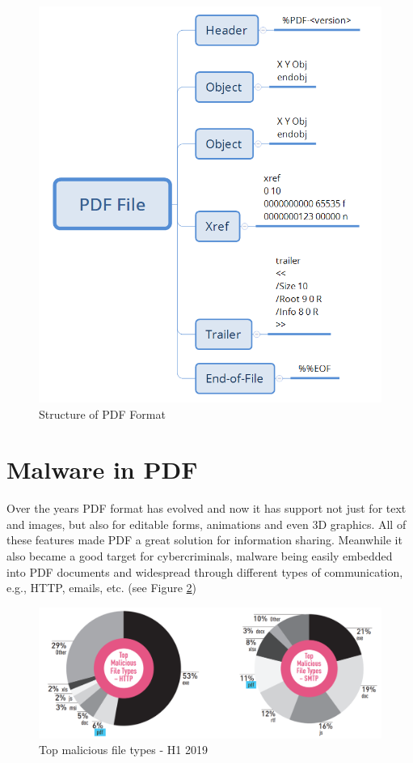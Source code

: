 \begin{figure}[H]
	\centerline{\includegraphics[scale=0.4]{figures/PDFSkeleton.png}}  
	\caption{Structure of PDF Format \cite{logrhythm}}
	\label{pdfSkeleton}
\end{figure}


\section{Malware in PDF}
\label{section:malwareInPDF}
Over the years PDF format has evolved and now it has support not just for text and images, but also for editable forms, animations and even 3D graphics. All of these features made PDF a great solution for information sharing. Meanwhile it also became a good target for cybercriminals, malware being easily embedded into PDF documents and widespread through different types of communication, e.g., HTTP, emails, etc. (see Figure \ref{pdfmalware})

\begin{figure}[H]
	\centerline{\includegraphics[scale=0.5]{figures/maliciousPDF.png}}  
	\caption{Top malicious file types - H1 2019 \cite{pdfattack}}
	\label{pdfmalware}
\end{figure}


